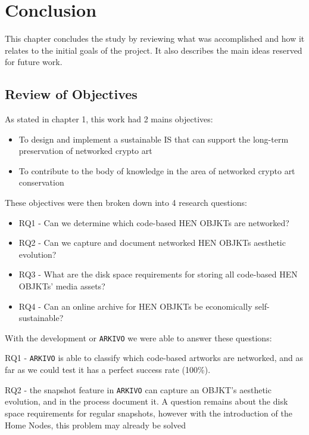 \chapter{Conclusion}

This chapter concludes the study by reviewing what was accomplished and how it relates to the initial goals of the project. It also describes the main ideas reserved for future work.

\section{Review of Objectives}

As stated in chapter 1, this work had 2 mains objectives:

\begin{itemize}
	\item To design and implement a sustainable IS that can support the long-term preservation of networked crypto art
	\item To contribute to the body of knowledge in the area of networked crypto art conservation
\end{itemize}

These objectives were then broken down into 4 research questions:

\begin{itemize}
	\item RQ1 - Can we determine which code-based HEN OBJKTs are networked?
	\item RQ2 - Can we capture and document networked HEN OBJKTs aesthetic evolution?
	\item RQ3 - What are the disk space requirements for storing all code-based HEN OBJKTs' media assets?
	\item RQ4 - Can an online archive for HEN OBJKTs be economically self-sustainable?
\end{itemize}

With the development or \texttt{ARKIVO} we were able to answer these questions:

RQ1 - \texttt{ARKIVO} is able to classify which code-based artworks are networked, and as far as we could test it has a perfect success rate (100\%).

RQ2 - the snapshot feature in \texttt{ARKIVO} can capture an OBJKT's aesthetic evolution, and in the process document it. A question remains about the disk space requirements for regular snapshots, however with the introduction of the Home Nodes, this problem may already be solved


